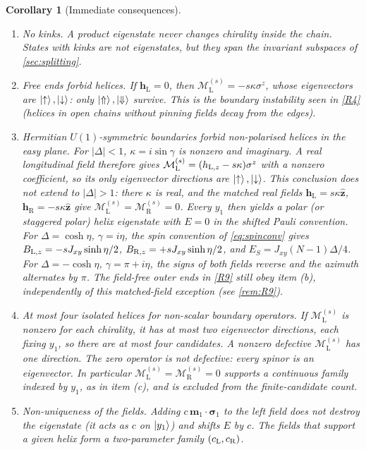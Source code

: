 \documentclass[11pt,a4paper]{article}
\newtheorem{corollary}[theorem]{Corollary}
\theoremstyle{definition}
\newcommand{\hL}{\mathbf h_{\mathrm L}}
\newcommand{\hR}{\mathbf h_{\mathrm R}}
\newcommand{\bsig}{\boldsymbol\sigma}
\newcommand{\ML}[1][s]{\mathcal M_{\mathrm L}^{(#1)}}
\newcommand{\MR}[1][s]{\mathcal M_{\mathrm R}^{(#1)}}
\newcommand{\ez}{\hat{\mathbf z}}
\begin{document}
\begin{corollary}[Immediate consequences]\label{cor:consequences}
\begin{enumerate}[label=(\alph*)]
\item \emph{No kinks.} A product eigenstate never changes chirality inside the chain. States with kinks are not eigenstates, but they span the invariant subspaces of \cref{sec:splitting}.
\item \emph{Free ends forbid helices.} If $\hL=0$, then $\ML=-s\kappa\sigma^z$, whose eigenvectors are $\ket\uparrow,\ket\downarrow$: only $\ket\Uparrow,\ket\Downarrow$ survive. This is the boundary instability seen in \ref{R4} (helices in open chains without pinning fields decay from the edges).
\item \emph{Hermitian $U(1)$-symmetric boundaries forbid non-polarised helices in the easy plane.} For $|\Delta|<1$, $\kappa=i\sin\gamma$ is nonzero and imaginary. A real longitudinal field therefore gives $\ML=(h_{{\rm L},z}-s\kappa)\sigma^z$ with a nonzero coefficient, so its only eigenvector directions are $\ket\uparrow,\ket\downarrow$. This conclusion does not extend to $|\Delta|>1$: there $\kappa$ is real, and the matched real fields $\hL=s\kappa\ez$, $\hR=-s\kappa\ez$ give $\ML=\MR=0$. Every $y_1$ then yields a polar (or staggered polar) helix eigenstate with $E=0$ in the shifted Pauli convention. For $\Delta=\cosh\eta$, $\gamma=i\eta$, the spin convention of \eqref{eq:spinconv} gives $B_{{\rm L},z}=-sJ_{xy}\sinh\eta/2$, $B_{{\rm R},z}=+sJ_{xy}\sinh\eta/2$, and $E_S=J_{xy}(N-1)\Delta/4$. For $\Delta=-\cosh\eta$, $\gamma=\pi+i\eta$, the signs of both fields reverse and the azimuth alternates by $\pi$. The field-free outer ends in \ref{R9} still obey item (b), independently of this matched-field exception (see \cref{rem:R9}).
\item \emph{At most four isolated helices for non-scalar boundary operators.} If $\ML$ is nonzero for each chirality, it has at most two eigenvector directions, each fixing $y_1$, so there are at most four candidates. A nonzero defective $\ML$ has one direction. The zero operator is not defective: every spinor is an eigenvector. In particular $\ML=\MR=0$ supports a continuous family indexed by $y_1$, as in item (c), and is excluded from the finite-candidate count.
\item \emph{Non-uniqueness of the fields.} Adding $c\,\mathbf m_1\cdot\bsig_1$ to the left field does not destroy the eigenstate (it acts as $c$ on $\ket{y_1}$) and shifts $E$ by $c$. The fields that support a \emph{given} helix form a two-parameter family $(c_{\rm L},c_{\rm R})$.
\end{enumerate}
\end{corollary}
\end{document}
